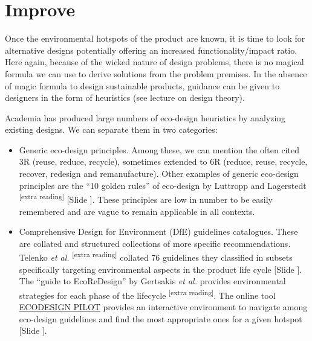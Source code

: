 \documentclass{article}
\newcounter{slide}
\begin{document}
\section{Improve}
\label{sec:improve}

Once the environmental hotspots of the product are known, it is time to look for alternative designs potentially offering an increased functionality/impact ratio. Here again, because of the wicked nature of design problems, there is no magical formula we can use to derive solutions from the problem premises. In the absence of magic formula to design sustainable products, guidance can be given to designers in the form of heuristics (see lecture on design theory). 

Academia has produced large numbers of eco-design heuristics by analyzing existing designs. We can separate them in two categories:
\begin{itemize}
	\item Generic eco-design principles. Among these, we can mention the often cited 3R (reuse, reduce, recycle), sometimes extended to 6R (reduce, reuse, recycle, recover, redesign and remanufacture). Other examples of generic eco-design principles are the ``10 golden rules'' of eco-design by Luttropp and Lagerstedt \cite{luttroppEcoDesignTenGolden2006a}\textsuperscript{\color{Magenta}[extra reading]} {\color{blue}[Slide ]}. These principles are low in number to be easily remembered and are vague to remain applicable in all contexts.
	\item Comprehensive Design for Environment (DfE) guidelines catalogues. These are collated and structured collections of more specific recommendations. Telenko \emph{et al.} \cite{telenkoCompilationDesignEnvironment2016a}\textsuperscript{\color{Magenta}[extra reading]} collated 76 guidelines they classified in subsets specifically targeting environmental aspects in the product life cycle {\color{blue}[Slide ]}. The ``guide to EcoReDesign'' by Gertsakis \emph{et al.} provides environmental strategies for each phase of the lifecycle \cite{gertsakisGuideEcoReDesignImproving1997}\textsuperscript{\color{Magenta}[extra reading]}. The online tool \href{http://pilot.ecodesign.at/pilot/ONLINE/ENGLISH/INDEX.HTM}{ECODESIGN PILOT} provides an interactive environment to navigate among eco-design guidelines and find the most appropriate ones for a given hotspot {\color{blue}[Slide ]}. 
\end{itemize}
\end{document}
